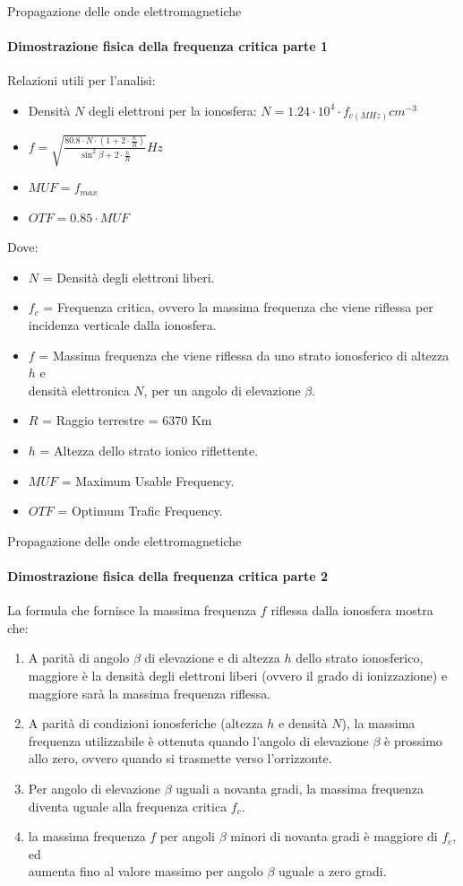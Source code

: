 \documentclass[aspectratio=169]{beamer}
\begin{document}
\begin{frame}{Propagazione delle onde elettromagnetiche}
	\framesubtitle{Dimostrazione fisica della frequenza critica parte 1}
	Relazioni utili per l'analisi:\\
	\begin{itemize}
		\item Densità $ N $ degli elettroni per la ionosfera: $N = 1.24 \cdot 10^{4} \cdot f_{c(MHz)} cm^{-3}$
		\item $f = \sqrt{\frac{80.8 \cdot N \cdot (1+2\cdot\frac{h}{R})}{\sin^{2} \beta + 2\cdot\frac{h}{R}}}Hz$ 
		\item $MUF = f_{max}$
		\item $OTF = 0.85 \cdot MUF$
	\end{itemize}
\smallskip
Dove:\\
\begin{itemize}
	\item[] $N$ = Densità degli elettroni liberi.
	\item[] $f_c$ = Frequenza critica, ovvero la massima frequenza che viene riflessa per incidenza verticale dalla ionosfera.
	\item[] $f$ = Massima frequenza che viene riflessa da uno strato ionosferico di altezza $h$ e \\densità elettronica $N$, per un angolo di elevazione $\beta$.
	\item[] $R$ = Raggio terrestre = 6370 Km
	\item[] $h$ = Altezza dello strato ionico riflettente.
	\item[] $MUF$ = Maximum Usable Frequency.
	\item[] $OTF$ = Optimum Trafic Frequency. 
\end{itemize}
\end{frame}

\begin{frame}{Propagazione delle onde elettromagnetiche}
	\framesubtitle{Dimostrazione fisica della frequenza critica parte 2}
	La formula che fornisce la massima frequenza $f$ riflessa dalla ionosfera mostra che:\\
	\smallskip
	\begin{enumerate}
		\item A parità di angolo $\beta$ di elevazione e di altezza $h$ dello strato ionosferico, maggiore è la densità degli elettroni liberi (ovvero il grado di ionizzazione) e maggiore sarà la massima frequenza riflessa.
		\item A parità di condizioni ionosferiche (altezza $h$ e densità $N$), la massima frequenza utilizzabile è ottenuta quando l'angolo di elevazione $\beta$ è prossimo allo zero, ovvero quando si trasmette verso l'orrizzonte.
		\item Per angolo di elevazione $\beta$ uguali a novanta gradi, la massima frequenza diventa uguale alla frequenza critica $f_{c}$.
		\item la massima frequenza $f$ per angoli $\beta$ minori di novanta gradi è maggiore di $f_{c}$, ed \\aumenta fino al valore massimo per angolo $\beta$ uguale a zero gradi.
	\end{enumerate}
\end{frame}
\end{document}
